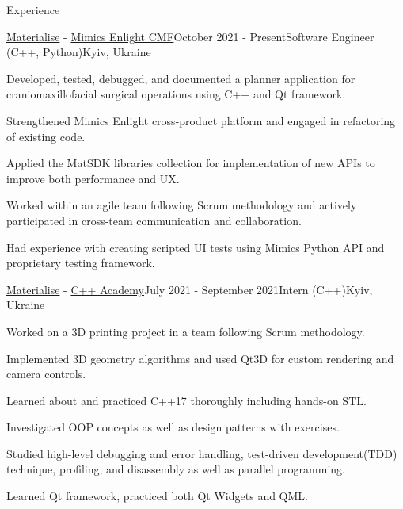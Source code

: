 \documentclass[
	11pt, %
]{resume} %
\begin{document}

\begin{rSection}{Experience}

	\begin{rSubsection}{\href{https://www.materialise.com/en}{\color{blue}Materialise} - \href{https://www.materialise.com/ja/healthcare/mimics-enlight-cmf}{\color{blue}Mimics Enlight CMF}}{October 2021 - Present}{Software Engineer (C++, Python)}{Kyiv, Ukraine}
        \item Developed, tested, debugged, and documented a planner application for craniomaxillofacial surgical operations using C++ and Qt framework.
        \item Strengthened Mimics Enlight cross-product platform and engaged in refactoring of existing code.
		\item Applied the MatSDK libraries collection for implementation of new APIs to improve both performance and UX.
        \item Worked within an agile team following Scrum methodology and actively participated in cross-team communication and collaboration.
        \item Had experience with creating scripted UI tests using Mimics Python API and proprietary testing framework.
	\end{rSubsection}


    \begin{rSubsection}{\href{https://www.materialise.com/en}{\color{blue}Materialise} - \href{https://www.materialise.com/en/careers/students-graduates/internships}{\color{blue}C++ Academy}}{July 2021 - September 2021}{Intern (C++)}{Kyiv, Ukraine}
        \item Worked on a 3D printing project in a team following Scrum methodology.
        \item Implemented 3D geometry algorithms and used Qt3D for custom rendering and camera controls.
        \item Learned about and practiced C++17 thoroughly including hands-on STL.
        \item Investigated OOP concepts as well as design patterns with exercises.
        \item Studied high-level debugging and error handling, test-driven development(TDD) technique, profiling, and disassembly as well as parallel programming.
        \item Learned Qt framework, practiced both Qt Widgets and QML.
    \end{rSubsection}

\end{rSection}
\end{document}
